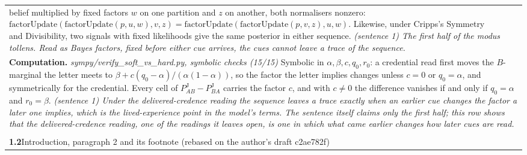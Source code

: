\documentclass[10pt]{article}
\theoremstyle{definition}
\newcommand{\PJ}{P^{\mathrm{J}}}
\newlength{\fullw}\setlength{\fullw}{25.9cm}
\newcommand{\entryhead}[2]{\multicolumn{3}{|l|}{\rule{0pt}{2.6ex}\large\textbf{#1}\quad #2} \\ \hline}
\begin{document}
{\begin{longtable}{|p{0.9cm}|p{12.2cm}|p{12.2cm}|}
{belief multiplied by fixed factors $w$ on one partition and $z$ on another, both
normalisers nonzero:
$\mathrm{factorUpdate}(\mathrm{factorUpdate}(p,u,w),v,z)
=\mathrm{factorUpdate}(\mathrm{factorUpdate}(p,v,z),u,w)$. Likewise, under Cripps's
Symmetry and Divisibility, two signals with fixed likelihoods give the same posterior
in either sequence. \newline \textit{(sentence 1) The first half of the modus tollens. Read as Bayes factors,
fixed before either cue arrives, the cues cannot leave a trace of the sequence.}} \\
\multicolumn{3}{|p{\fullw}|}{\textbf{Computation.} \textit{sympy/verify\_soft\_vs\_hard.py, symbolic checks (15/15)} \newline Symbolic in $\alpha,\beta,c,q_0,r_0$: a credential read first moves the
$B$-marginal the letter meets to $\beta+c(q_0-\alpha)/(\alpha(1-\alpha))$, so the
factor the letter implies changes unless $c=0$ or $q_0=\alpha$, and symmetrically for
the credential. Every cell of $\PJ_{AB}-\PJ_{BA}$ carries the factor $c$, and with
$c\neq0$ the difference vanishes if and only if $q_0=\alpha$ and $r_0=\beta$. \newline \textit{(sentence 1) Under the delivered-credence reading the sequence leaves a
trace exactly when an earlier cue changes the factor a later one implies, which is
the lived-experience point in the model's terms. The sentence itself claims only the
first half; this row shows that the delivered-credence reading, one of the readings it
leaves open, is one in which what came earlier changes how later cues are read.}} \\ \hline
\multicolumn{3}{|l|}{} \\ \hline
\entryhead{1.2}{Introduction, paragraph 2 and its footnote (rebased on the author's draft c2ae782f)\quad{\footnotesize\textit{(formerly C.3)}}}

\end{longtable}}
\end{document}
